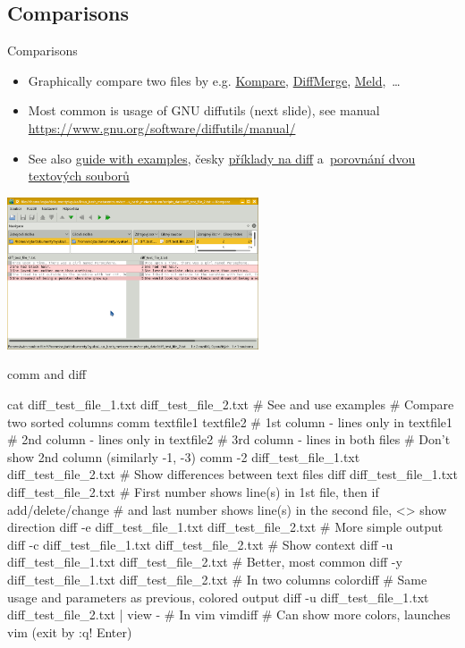 \documentclass[compress, ucs, xelatex, 11pt, xcolor=svgnames,
  hyperref={
    bookmarks=true,
    unicode=true,
    colorlinks=true,
    pdftitle={Linux, command line and MetaCentrum},
    plainpages=false,
    pdfauthor={Vojtech Zeisek},
    pdfsubject={Course about use of Linux command line, writing shell scripts and using MetaCentrum of CESNET},
    pdfcreator={XeLaTeX},
    pdfkeywords={Linux, GNU, BASH, shell, command line, MetaCentrum},
    linkcolor=DarkRed,
    anchorcolor=DarkBlue,
    citecolor=Indigo,
    filecolor=NavyBlue,
    menucolor=DarkMagenta,
    urlcolor=DarkBlue,
    pdftex},
  url={hyphens, lowtilde} %
  ]{beamer}
\begin{document}
\subsection{Comparisons}

\begin{frame}{Comparisons}
  \begin{itemize}
    \item Graphically compare two files by e.g. \href{https://www.kde.org/applications/development/kompare/}{Kompare}, \href{https://sourcegear.com/diffmerge/}{DiffMerge}, \href{http://meldmerge.org/}{Meld},~\ldots
    \item Most common is usage of GNU diffutils (next slide), see manual \url{https://www.gnu.org/software/diffutils/manual/}
    \item See also \href{https://www.computerhope.com/unix/udiff.htm}{guide with examples}, česky \href{https://blog.root.cz/petrkrcmar/diff-jak-cist-vystup-z-porovnani-souboru/}{příklady na diff} a~\href{https://www.root.cz/clanky/nastroje-pro-porovnani-obsahu-dvou-textovych-souboru/}{porovnání dvou textových souborů}
  \end{itemize}
  \begin{center}
    \includegraphics[height=4.5cm]{kompare.png}
  \end{center}
\end{frame}

\begin{frame}[fragile]{comm and diff}
  \begin{bashcode}
    cat diff_test_file_1.txt diff_test_file_2.txt # See and use examples
    # Compare two sorted columns
    comm textfile1 textfile2
      # 1st column - lines only in textfile1
      # 2nd column - lines only in textfile2
      # 3rd column - lines in both files
    # Don't show 2nd column (similarly -1, -3)
    comm -2 diff_test_file_1.txt diff_test_file_2.txt
    # Show differences between text files
    diff diff_test_file_1.txt diff_test_file_2.txt
      # First number shows line(s) in 1st file, then if add/delete/change
      # and last number shows line(s) in the second file, <> show direction
    diff -e diff_test_file_1.txt diff_test_file_2.txt # More simple output
    diff -c diff_test_file_1.txt diff_test_file_2.txt # Show context
    diff -u diff_test_file_1.txt diff_test_file_2.txt # Better, most common
    diff -y diff_test_file_1.txt diff_test_file_2.txt # In two columns
    colordiff # Same usage and parameters as previous, colored output
    diff -u diff_test_file_1.txt diff_test_file_2.txt | view - # In vim
    vimdiff # Can show more colors, launches vim (exit by :q! Enter)
  \end{bashcode}
\end{frame}
\end{document}
